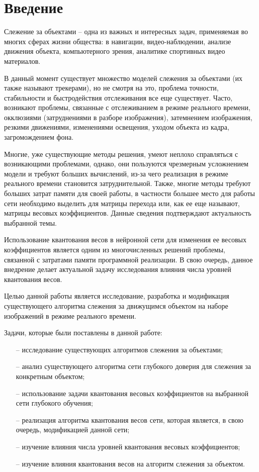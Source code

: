 \section*{Введение}

Слежение за объектами -- одна из важных и интересных задач, применяемая во многих сферах жизни общества: в навигации, видео-наблюдении, анализе движения объекта, компьютерного зрения, аналитике спортивных видео материалов.  

В данный момент существует множество моделей слежения за объектами (их также называют трекерами), но не смотря на это, проблема точности, стабильности и быстродействия отслеживания все еще существует. Часто, возникают проблемы, связанные с отслеживанием в режиме реального времени, окклюзиями (затруднениями в разборе изображения), затемнением изображения, резкими движениями, изменениями освещения, уходом объекта из кадра, загромождением фона.

Многие, уже существующие методы решения, умеют неплохо справляться с возникающими проблемами, однако, они пользуются чрезмерным усложнением модели и требуют больших вычислений, из-за чего реализация в режиме реального времени становится затруднительной. Также, многие методы требуют больших затрат памяти для своей работы, в частности большее место для работы сети необходимо выделить для матрицы перехода или, как ее еще называют, матрицы весовых коэффициентов. Данные сведения подтверждают актуальность выбранной темы. 

Использование квантования весов в нейронной сети для изменения ее весовых коэффициентов  является одним из многочисленных решений проблемы, связанной с затратами памяти программной реализации. В свою очередь, данное внедрение делает актуальной задачу исследования влияния числа уровней квантования весов. 

Целью данной работы является исследование, разработка и модификация существующего алгоритма слежения за движущимся объектом на наборе изображений в режиме реального времени.

Задачи, которые были поставлены в данной работе:

\begin{itemize}[leftmargin=0em, itemindent=2.5 em,itemsep=1.5 pt,parsep=1.5 pt]
        \item[--] исследование существующих алгоритмов слежения за объектами; 
        \item[--] анализ существующего алгоритма сети глубокого доверия для слежения за конкретным объектом;
        \item[--] использование задачи квантования весовых коэффициентов на выбранной сети глубокого обучения;
        \item[--] реализация алгоритма квантования весов сети, которая является, в свою очередь, модификацией данной сети;
        \item[--] изучение влияния числа уровней квантования весовых коэффициентов;
        \item[--] изучение влияния квантования весов на алгоритм слежения за объектом.
\end{itemize}
